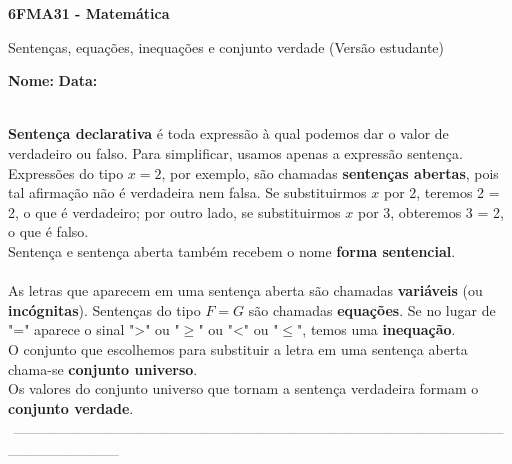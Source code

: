 \documentclass[a4paper,14pt]{article}
\begin{document}
	
	\noindent\textbf{6FMA31 - Matemática} 
	
	\begin{center}Sentenças, equações, inequações e conjunto verdade (Versão estudante)
	\end{center}
	
	\noindent\textbf{Nome:} \underline{\hspace{10cm}}
	\noindent\textbf{Data:} \underline{\hspace{4cm}}
	
	
	~ \\
	\noindent\textbf{Sentença declarativa} é toda expressão à qual podemos dar o valor de verdadeiro ou falso. Para simplificar, usamos apenas a expressão sentença. \\
	Expressões do tipo $x = 2$, por exemplo, são chamadas \textbf{sentenças abertas}, pois tal afirmação não é verdadeira nem falsa. Se substituirmos $x$ por 2, teremos 2 = 2, o que é verdadeiro; por outro lado, se substituirmos $x$ por 3, obteremos 3 = 2, o que é falso. \\
	Sentença e sentença aberta também recebem o nome \textbf{forma sentencial}. \\\\
	As letras que aparecem em uma sentença aberta são chamadas \textbf{variáveis} (ou \textbf{incógnitas}).
	Sentenças do tipo $F = G$ são chamadas \textbf{equações}. Se no lugar de "=" aparece o sinal ">" ou "$\geq$" ou "<" ou "$\leq$", temos uma \textbf{inequação}. \\
	O conjunto que escolhemos para substituir a letra em uma sentença aberta chama-se \textbf{conjunto universo}. \\
	Os valores do conjunto universo que tornam a sentença verdadeira formam o \textbf{conjunto verdade}. \\
	\noindent\textsubscript{~-----------------------------------------------------------------------------------------------------------------------------------------------------------}
\end{document}
